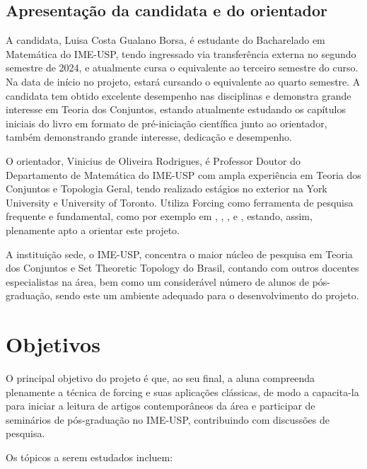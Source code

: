 \documentclass{article}
\begin{document}
    \subsection{Apresentação da candidata e do orientador}

    A candidata, Luisa Costa Gualano Borsa, é estudante do Bacharelado em Matemática do IME-USP, tendo ingressado via transferência externa no segundo semestre de 2024, e atualmente cursa o equivalente ao terceiro semestre do curso.
    Na data de início no projeto, estará cursando o equivalente ao quarto semestre.
    A candidata tem obtido excelente desempenho nas disciplinas e demonstra grande interesse em Teoria dos Conjuntos, estando atualmente estudando os capítulos iniciais do livro \cite{hrbacek2017introduction} em formato de pré-iniciação científica junto ao orientador, também demonstrando grande interesse, dedicação e desempenho.

    O orientador, Vinicius de Oliveira Rodrigues, é Professor Doutor do Departamento de Matemática do IME-USP com ampla experiência em Teoria dos Conjuntos e Topologia Geral, tendo realizado estágios no exterior na York University e University of Toronto.
    Utiliza Forcing como ferramenta de pesquisa frequente e fundamental, como por exemplo em \cite{bellini2021forcing}, \cite{carvalho2024products}, \cite{corral2022fin}, \cite{guzman2022maximal} e \cite{rodrigues2021almost}, estando, assim, plenamente apto a orientar este projeto.

    A instituição sede, o IME-USP, concentra o maior núcleo de pesquisa em Teoria dos Conjuntos e Set Theoretic Topology do Brasil, contando com outros docentes especialistas na área, bem como um considerável número de alunos de pós-graduação, sendo este um ambiente adequado para o desenvolvimento do projeto. 

    \section{Objetivos}
    O principal objetivo do projeto é que, ao seu final, a aluna compreenda plenamente a técnica de forcing e suas aplicações clássicas, de modo a capacita-la para iniciar a leitura de artigos contemporâneos da área e participar de seminários de pós-graduação no IME-USP, contribuindo com discussões de pesquisa.

    Os tópicos a serem estudados incluem:
\end{document}
